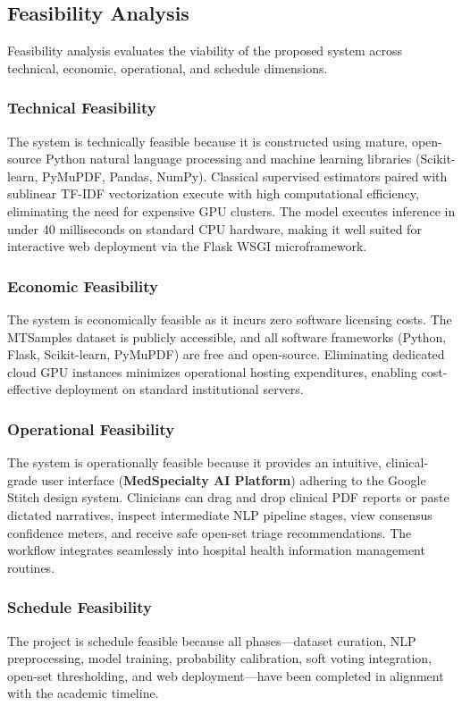 \FloatBarrier

\subsection{Feasibility Analysis}

Feasibility analysis evaluates the viability of the proposed system across technical, economic, operational, and schedule dimensions.

\subsubsection{Technical Feasibility}
The system is technically feasible because it is constructed using mature, open-source Python natural language processing and machine learning libraries (Scikit-learn, PyMuPDF, Pandas, NumPy). Classical supervised estimators paired with sublinear TF-IDF vectorization execute with high computational efficiency, eliminating the need for expensive GPU clusters. The model executes inference in under 40 milliseconds on standard CPU hardware, making it well suited for interactive web deployment via the Flask WSGI microframework.

\subsubsection{Economic Feasibility}
The system is economically feasible as it incurs zero software licensing costs. The MTSamples dataset is publicly accessible, and all software frameworks (Python, Flask, Scikit-learn, PyMuPDF) are free and open-source. Eliminating dedicated cloud GPU instances minimizes operational hosting expenditures, enabling cost-effective deployment on standard institutional servers.

\subsubsection{Operational Feasibility}
The system is operationally feasible because it provides an intuitive, clinical-grade user interface (\textbf{MedSpecialty AI Platform}) adhering to the Google Stitch design system. Clinicians can drag and drop clinical PDF reports or paste dictated narratives, inspect intermediate NLP pipeline stages, view consensus confidence meters, and receive safe open-set triage recommendations. The workflow integrates seamlessly into hospital health information management routines.

\subsubsection{Schedule Feasibility}
The project is schedule feasible because all phases---dataset curation, NLP preprocessing, model training, probability calibration, soft voting integration, open-set thresholding, and web deployment---have been completed in alignment with the academic timeline.

